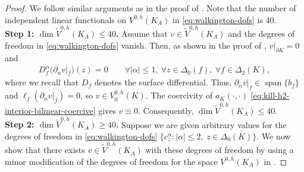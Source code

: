 \documentclass{mcom-l}
\theoremstyle{definition}
\theoremstyle{remark}
\numberwithin{equation}{section}
\DeclareMathOperator{\spann}{span}
\begin{document}
\begin{proof}
	We follow similar arguments as in the proof of
	\cite[Lemma 2.3]{Walkington14}. 
	Note that the number of independent linear functionals 
	on $V^{0, h}(K_A)$ in 
	\cref{eq:walkington-dofs} is 40. \\
	
	\noindent \textbf{Step 1: $\dim \tilde{V}^{0, h}(K_A) \leq 40$. } 
	Assume that $v \in \tilde{V}^{0, h}(K_A)$ and the degrees of freedom in 
	\cref{eq:walkington-dofs} vanish. Then, as shown in the proof of
	\cite[Lemma 2.3]{Walkington14}, $v|_{\partial K} = 0$ and 
	\begin{align*}
		D_f^{\alpha} (\partial_n v|_{f})(z) = 0 \qquad 
		\forall |\alpha| \leq 1, \ 
		\forall z \in \Delta_0(f), \ \forall f \in \Delta_2(K),
	\end{align*}
	where we recall that $D_f$ denotes the surface differential. Thus, 
	$\partial_n v|_{f} \in \spann\{ b_f \}$ and 
	$\ell_f(\partial_n v|_{f}) = 0$, so $v \in V^{0, h}_0(K)$. 
	The coercivity of $a_K(\cdot,\cdot)$
	\cref{eq:kill-h2-interior-bilinear-coercive}
	gives $v \equiv 0$. Consequently, $\dim \tilde{V}^{0, h}(K_A) \leq 40$. \\
	
	\noindent \textbf{Step 2: $\dim \tilde{V}^{0, h}(K_A) \geq 40$. } 	
	Suppose we are given
	arbitrary values for the degrees of freedom in \cref{eq:walkington-dofs}
	$\{ c_{z}^{\alpha} : |\alpha| \leq 2, \ z \in \Delta_0(K) \}$.
	We now show that there exists $v \in \tilde{V}^{0, h}(K_A)$ with 
	these degrees of freedom by using a minor modification of
	the degrees of freedom for the space $V^{0, h}(K_A)$ in 
	\cite[Lemma 4.8]{FuGuzmanNeilan20}. 
	

\end{proof}
\end{document}
